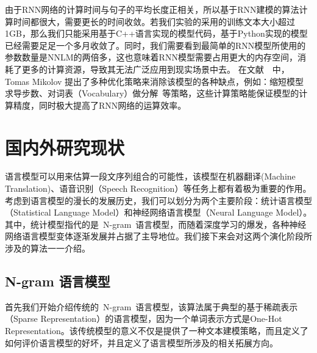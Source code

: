 由于RNN网络的计算时间与句子的平均长度正相关，所以基于RNN建模的算法计算时间都很大，需要更长的时间收敛。若我们实验的采用的训练文本大小超过1GB，那么我们只能采用基于C++语言实现的模型代码，基于Python实现的模型已经需要足足一个多月收敛了。同时，我们需要看到最简单的RNN模型所使用的参数数量是NNLM的两倍多，这也意味着RNN模型需要占用更大的内存空间，消耗了更多的计算资源，导致其无法广泛应用到现实场景中去。
在文献~\cite{DBLP:conf/icassp/MikolovKBCK11}~中，Tomas Mikolov 提出了多种优化策略来消除该模型的各种缺点，例如：缩短模型求导步数、对词表（Vocabulary）做分解~等策略，这些计算策略能保证模型的计算精度，同时极大提高了RNN网络的运算效率。

\section{国内外研究现状}
语言模型可以用来估算一段文序列组合的可能性，该模型在机器翻译(Machine Translation)、语音识别（Speech Recognition）等任务上都有着极为重要的作用。考虑到语言模型的漫长的发展历史，我们可以划分为两个主要阶段：统计语言模型（Statistical Language Model）和神经网络语言模型（Neural Language Model）。
其中，统计模型指代的是~N-gram~语言模型，而随着深度学习的爆发，各种神经网络语言模型变体逐渐发展并占据了主导地位。我们接下来会对这两个演化阶段所涉及的算法一一介绍。

\subsection{N-gram 语言模型}
首先我们开始介绍传统的~N-gram~语言模型，该算法属于典型的基于稀疏表示（Sparse Representation）的语言模型，因为一个单词表示方式是One-Hot Representation。该传统模型的意义不仅是提供了一种文本建模策略，而且定义了如何评价语言模型的好坏，并且定义了语言模型所涉及的相关拓展方向。

